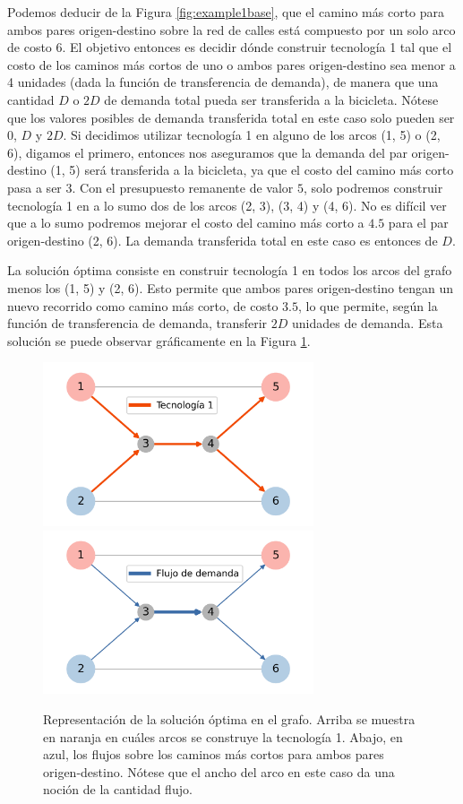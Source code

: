 Podemos deducir de la Figura \ref{fig:example1base}, que el camino más corto para ambos pares origen-destino sobre la red de calles está compuesto por un solo arco de costo 6. El objetivo entonces es decidir dónde construir tecnología 1 tal que el costo de los caminos más cortos de uno o ambos pares origen-destino sea menor a 4 unidades (dada la función de transferencia de demanda), de manera que una cantidad $D$ o $2D$ de demanda total pueda ser transferida a la bicicleta. Nótese que los valores posibles de demanda transferida total en este caso solo pueden ser $0$, $D$ y $2D$. Si decidimos utilizar tecnología 1 en alguno de los arcos (1, 5) o (2, 6), digamos el primero, entonces nos aseguramos que la demanda del par origen-destino (1, 5) será transferida a la bicicleta, ya que el costo del camino más corto pasa a ser $3$. Con el presupuesto remanente de valor $5$, solo podremos construir tecnología 1 en a lo sumo dos de los arcos (2, 3), (3, 4) y (4, 6). No es difícil ver que a lo sumo podremos mejorar el costo del camino más corto a $4.5$ para el par origen-destino (2, 6). La demanda transferida total en este caso es entonces de $D$.

La solución óptima consiste en construir tecnología 1 en todos los arcos del grafo menos los (1, 5) y (2, 6). Esto permite que ambos pares origen-destino tengan un nuevo recorrido como camino más corto, de costo $3.5$, lo que permite, según la función de transferencia de demanda, transferir $2D$ unidades de demanda. Esta solución se puede observar gráficamente en la Figura \ref{fig:example1solution}.

\begin{figure}[h!]
  \centering
  \includegraphics[width=8cm]{../resources/example_1_infras.png}
  \includegraphics[width=8cm]{../resources/example_1_flows.png}
  \caption{Representación de la solución óptima en el grafo. Arriba se muestra en naranja en cuáles arcos se construye la tecnología 1. Abajo, en azul, los flujos sobre los caminos más cortos para ambos pares origen-destino. Nótese que el ancho del arco en este caso da una noción de la cantidad flujo.}
  \label{fig:example1solution}
\end{figure}

